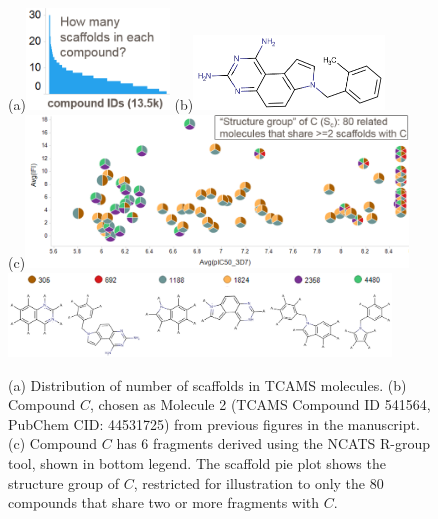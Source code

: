 \documentclass[11pt,letterpaper]{article}
\begin{document}
\begin{figure}
\centering
  (a)\includegraphics[width=1.5in]{../fig/howmany_scaf.png}
(b)\includegraphics[width=2in]{../fig/tcam2_mol_541564_v2.png}\\
\vspace{0.1in}
  (c)\includegraphics[width=4in]{../fig/structure_group_C_v2.png}\\
  \includegraphics[width=4in]{../fig/tcam2_541564_6scaf_row_v2.png}
  \caption{
    (a) Distribution of number of scaffolds in TCAMS molecules. (b) Compound $C$, chosen as Molecule 2 (TCAMS Compound ID 541564, PubChem CID: 44531725) from previous figures in the manuscript.
    (c) Compound $C$ has 6 fragments derived using the NCATS R-group tool, shown in bottom legend. The scaffold pie plot shows the structure group of $C$, restricted for illustration to only the 80 compounds that share two or more fragments with $C$.} %
    \label{fig:strucgroup}
\end{figure}
\end{document}
